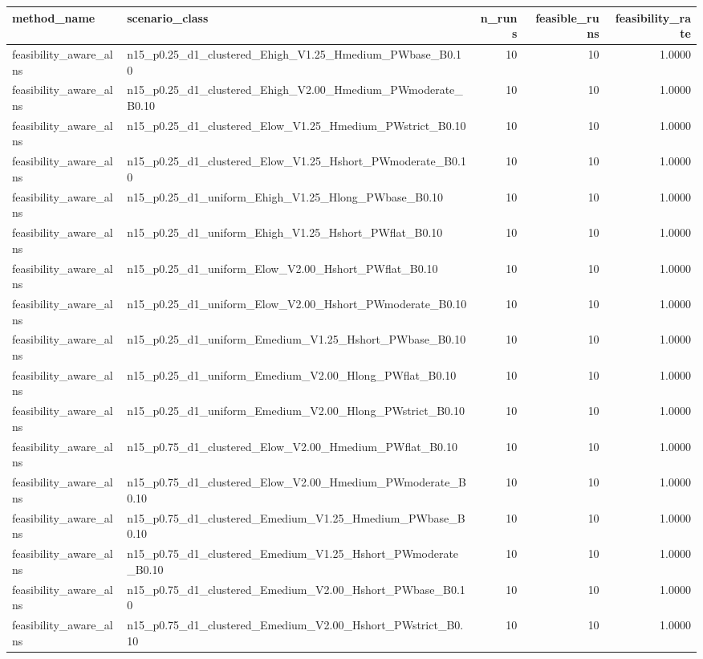 \begin{tabular}{llrrr}
\toprule
method_name & scenario_class & n_runs & feasible_runs & feasibility_rate \\
\midrule
feasibility_aware_alns & n15_p0.25_d1_clustered_Ehigh_V1.25_Hmedium_PWbase_B0.10 & 10 & 10 & 1.0000 \\
feasibility_aware_alns & n15_p0.25_d1_clustered_Ehigh_V2.00_Hmedium_PWmoderate_B0.10 & 10 & 10 & 1.0000 \\
feasibility_aware_alns & n15_p0.25_d1_clustered_Elow_V1.25_Hmedium_PWstrict_B0.10 & 10 & 10 & 1.0000 \\
feasibility_aware_alns & n15_p0.25_d1_clustered_Elow_V1.25_Hshort_PWmoderate_B0.10 & 10 & 10 & 1.0000 \\
feasibility_aware_alns & n15_p0.25_d1_uniform_Ehigh_V1.25_Hlong_PWbase_B0.10 & 10 & 10 & 1.0000 \\
feasibility_aware_alns & n15_p0.25_d1_uniform_Ehigh_V1.25_Hshort_PWflat_B0.10 & 10 & 10 & 1.0000 \\
feasibility_aware_alns & n15_p0.25_d1_uniform_Elow_V2.00_Hshort_PWflat_B0.10 & 10 & 10 & 1.0000 \\
feasibility_aware_alns & n15_p0.25_d1_uniform_Elow_V2.00_Hshort_PWmoderate_B0.10 & 10 & 10 & 1.0000 \\
feasibility_aware_alns & n15_p0.25_d1_uniform_Emedium_V1.25_Hshort_PWbase_B0.10 & 10 & 10 & 1.0000 \\
feasibility_aware_alns & n15_p0.25_d1_uniform_Emedium_V2.00_Hlong_PWflat_B0.10 & 10 & 10 & 1.0000 \\
feasibility_aware_alns & n15_p0.25_d1_uniform_Emedium_V2.00_Hlong_PWstrict_B0.10 & 10 & 10 & 1.0000 \\
feasibility_aware_alns & n15_p0.75_d1_clustered_Elow_V2.00_Hmedium_PWflat_B0.10 & 10 & 10 & 1.0000 \\
feasibility_aware_alns & n15_p0.75_d1_clustered_Elow_V2.00_Hmedium_PWmoderate_B0.10 & 10 & 10 & 1.0000 \\
feasibility_aware_alns & n15_p0.75_d1_clustered_Emedium_V1.25_Hmedium_PWbase_B0.10 & 10 & 10 & 1.0000 \\
feasibility_aware_alns & n15_p0.75_d1_clustered_Emedium_V1.25_Hshort_PWmoderate_B0.10 & 10 & 10 & 1.0000 \\
feasibility_aware_alns & n15_p0.75_d1_clustered_Emedium_V2.00_Hshort_PWbase_B0.10 & 10 & 10 & 1.0000 \\
feasibility_aware_alns & n15_p0.75_d1_clustered_Emedium_V2.00_Hshort_PWstrict_B0.10 & 10 & 10 & 1.0000 \\

\end{tabular}
